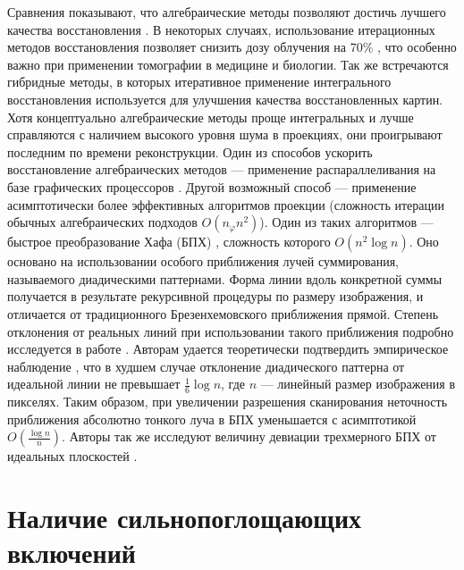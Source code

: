 Сравнения показывают, что алгебраические методы позволяют достичь лучшего качества восстановления \cite{sirt_less_artifacts, Lucas_sota_ir_survey_2015_radiology}.
В некоторых случаях, использование итерационных методов восстановления позволяет снизить дозу облучения на 70\% \cite{Willemink2013}, что особенно важно при применении томографии в медицине и биологии.
Так же встречаются гибридные методы, в которых итеративное применение интегрального восстановления используется для улучшения качества восстановленных картин.
Хотя концептуально алгебраические методы проще интегральных и лучше справляются с наличием высокого уровня шума в проекциях, они проигрывают последним по времени реконструкции.
Один из способов ускорить восстановление алгебраических методов --- применение распараллеливания на базе графических процессоров \cite{buz2011cuda, sirt_gpu}.
Другой возможный способ --- применение асимптотически более эффективных алгоритмов проекции (сложность итерации обычных алгебраических подходов $O(n_\varphi n^2)$).
Один из таких алгоритмов --- быстрое преобразование Хафа (БПХ) \cite{Brady1998, brady1992fast, hough}, сложность которого $O(n^2 \log n)$.
Оно основано на использовании особого приближения лучей суммирования, называемого диадическими паттернами.
Форма линии вдоль конкретной суммы получается в результате рекурсивной процедуры по размеру изображения, и отличается от традиционного Брезенхемовского приближения прямой.
Степень отклонения от реальных линий при использовании такого приближения подробно исследуется в работе \cite{ershov2015dyadic}.
Авторам удается теоретически подтвердить эмпирическое наблюдение \cite{Brady1998}, что в худшем случае отклонение диадического паттерна от идеальной линии не превышает $\frac 1 6 \log n$, где $n$ --- линейный размер изображения в пикселях.
Таким образом, при увеличении разрешения сканирования неточность приближения абсолютно тонкого луча в БПХ уменьшается с асимптотикой $O\left(\frac {\log n}{n}\right)$.
Авторы так же исследуют величину девиации трехмерного БПХ от идеальных плоскостей \cite{ershov3DHough}.

\section{Наличие сильнопоглощающих включений}

